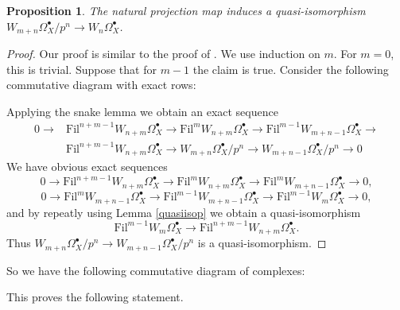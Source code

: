\documentclass[a4paper,12pt,twoside]{report}
\newtheorem{proposition}[theorem]{Proposition}
\newcommand{\G}{\mathbb{G}}
\newcommand{\Fil}{\mathrm{Fil}}
\begin{document}
\begin{proposition}\label{quasiiso}
    The natural projection map induces a quasi-isomorphism $W_{m+n}\Omega_X^\bullet/p^n \rightarrow  W_n\Omega_X^\bullet$. 
\end{proposition}
\begin{proof}
    Our proof is similar to the proof of \cite[Corollaire I.3.15]{Il1}. 
We use induction on $m$. For $m=0$, this is trivial. 
Suppose that for $m-1$ the claim is true. Consider the following commutative diagram
with exact rows:
\begin{center}
\end{center}
Applying the snake lemma we obtain an exact sequence 
\[\begin{aligned}
    0 \rightarrow& \Fil^{n+m-1}W_{n+m}\Omega_X^\bullet \rightarrow \Fil^{m}W_{n+m}\Omega_X^\bullet \rightarrow \Fil^{m-1}W_{m+n-1}\Omega_X^\bullet \rightarrow \\
    &\Fil^{n+m-1}W_{n+m}\Omega_X^\bullet \rightarrow W_{m+n}\Omega_X^\bullet/p^n \rightarrow W_{m+n-1}\Omega_X^\bullet/p^n \rightarrow 0
\end{aligned}\]
We have obvious exact sequences
\[0 \rightarrow \Fil^{n+m-1}W_{n+m}\Omega_X^\bullet \rightarrow \Fil^{m}W_{n+m}\Omega_X^\bullet \rightarrow \Fil^{m}W_{m+n-1}\Omega_X^\bullet \rightarrow 0,\]
\[0 \rightarrow \Fil^{m}W_{m+n-1}\Omega_X^\bullet \rightarrow \Fil^{m-1}W_{m+n-1}\Omega_X^\bullet \rightarrow \Fil^{m-1}W_m\Omega^\bullet_X \rightarrow 0,\]
and by repeatly using Lemma \ref{quasiisop} we obtain a quasi-isomorphism
\[\Fil^{m-1}W_m\Omega^\bullet_X \rightarrow \Fil^{n+m-1}W_{n+m}\Omega_X^\bullet.\]
Thus $W_{m+n}\Omega_X^\bullet/p^n \rightarrow W_{m+n-1}\Omega_X^\bullet/p^n $ 
is a quasi-isomorphism.
\end{proof}

\medskip

So we have the following commutative diagram of complexes:
\begin{center}
\end{center}
This proves the following statement.
\end{document}
